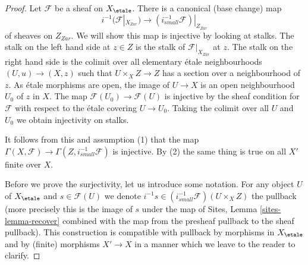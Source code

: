 \begin{proof}
Let $\mathcal{F}$ be a sheaf on $X_\etale$. There is a canonical
(base change) map
$$
i^{-1}(\mathcal{F}|_{X_{Zar}})
\longrightarrow
(i_{small}^{-1}\mathcal{F})|_{Z_{Zar}}
$$
of sheaves on $Z_{Zar}$. We will show this map is injective by looking
at stalks. The stalk on the left hand side at $z \in Z$
is the stalk of $\mathcal{F}|_{X_{Zar}}$ at $z$. The stalk on the right
hand side is the colimit over all elementary \'etale neighbourhoods
$(U, u) \to (X, z)$ such that $U \times_X Z \to Z$ has a section over
a neighbourhood of $z$. As \'etale morphisms are open, the image of
$U \to X$ is an open neighbourhood $U_0$ of $z$ in $X$. The map
$\mathcal{F}(U_0) \to \mathcal{F}(U)$ is injective by the sheaf
condition for $\mathcal{F}$ with respect to the \'etale covering $U \to U_0$.
Taking the colimit over all $U$ and $U_0$ we obtain injectivity on stalks.

\medskip\noindent
It follows from this and assumption (1) that the map
$\Gamma(X, \mathcal{F}) \to \Gamma(Z, i^{-1}_{small}\mathcal{F})$
is injective. By (2) the same thing is true on all $X'$ finite over $X$.

\medskip\noindent
Before we prove the surjectivity, let us introduce some notation. For
any object $U$ of $X_\etale$ and $s \in \mathcal{F}(U)$ we
denote $i^{-1}s \in (i_{small}^{-1}\mathcal{F})(U \times_X Z)$
the pullback (more precisely this is the image of $s$ under the map
of Sites, Lemma \ref{sites-lemma-recover} combined with the map from
the presheaf pullback to the sheaf pullback). This construction is
compatible with pullback by morphisms in $X_\etale$ and by (finite)
morphisms $X' \to X$ in a manner which we leave to the reader to clarify.


\end{proof}
